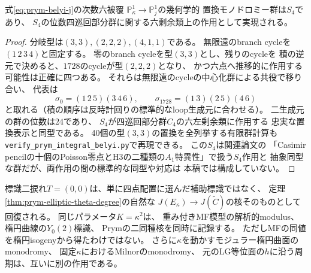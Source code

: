 \begin{corollary}[次数六Belyi写像のモノドロミーは$S_4$]
\label{cor:prym-belyi-S4}
式\eqref{eq:prym-belyi-j}の次数六被覆
$\mathbb P^1_\kappa\to\mathbb P^1_j$の幾何学的
置換モノドロミー群は$S_4$であり、
$S_4$の位数四巡回部分群に関する六剰余類上の作用として実現される。
\end{corollary}
\begin{proof}
分岐型は$(3,3),(2,2,2),(4,1,1)$である。
無限遠のbranch cycleを$(1\,2\,3\,4)$と固定する。
零のbranch cycleを型$(3,3)$とし、残りのcycleを
積の逆元で決めると、$1728$のcycleが型$(2,2,2)$となり、
かつ六点へ推移的に作用する可能性は正確に四つある。
それらは無限遠のcycleの中心化群による共役で移り合い、
代表は
\[
 \sigma_0=(1\,2\,5)(3\,4\,6),\qquad
 \sigma_{1728}=(1\,3)(2\,5)(4\,6)
\]
と取れる（積の順序は反時計回りの標準的なloop生成元に合わせる）。
二生成元の群の位数は$24$であり、
$S_4$が四巡回部分群$C_4$の六左剰余類に作用する
忠実な置換表示と同型である。
40個の型$(3,3)$の置換を全列挙する有限群計算も
\texttt{verify\_prym\_integral\_belyi.py}で再現できる。
この$S_4$は関連論文\cite{CompanionFricke}の
「Casimir pencilの十個のPoisson零点とH3の二種類の$A_1$特異性」で扱う$S_4$作用と
抽象同型な群だが、両作用の間の標準的な同型や対応は
本稿では構成していない。
\end{proof}

\begin{remark}
\label{rem:prym-three-levels}
標識二捩れ$T=(0,0)$は、単に四点配置に選んだ補助標識ではなく、
定理\ref{thm:prym-elliptic-theta-degree}の自然な
$J(E_\kappa)\to J(\widetilde C)$の核そのものとして回復される。
同じパラメータ$K=\kappa^2$は、
重み付きMF模型の解析的modulus、
楕円曲線の$Y_0(2)$標識、
Prymの二同種核を同時に記録する。
ただしMFの同値を楕円isogenyから得たわけではない。
さらに$\kappa$を動かすモジュラー楕円曲面のmonodromy、
固定$\kappa$におけるMilnorのmonodromy、
元のLG等位面の$h$に沿う周期は、互いに別の作用である。
\end{remark}
